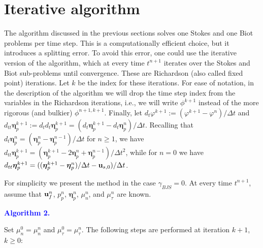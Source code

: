 \documentclass[11pt]{article}
\def\u{{\bf u}}
\def\bbeta{\boldsymbol{\eta}}
\def\dt{d_t}
\def\dtt{d_{tt}}
\begin{document}
\section{Iterative algorithm}\label{sec:iter}


The algorithm discussed in the previous sections solves one Stokes and one Biot problems per time step. This is a computationally efficient choice, but it introduces a splitting error. To avoid this error, one could use the iterative version of the algorithm, which at every time $t^{n+1}$ iterates over the Stokes and Biot sub-problems until convergence. These are Richardson (also called fixed point) iterations. Let $k$ be the index for these iterations. For ease of notation, in the description of the algorithm we will drop the time step index from the variables in the Richardson iterations, i.e., we will write $\phi^{k+1}$ instead of the more rigorous (and bulkier)  $\phi^{n+1, k+1}$. 
{Finally, let $\dt\varphi^{k+1} := (\varphi^{k+1} - \varphi^{n})/{\Delta t}$ and
$\dtt\bbeta_p^{k+1} := \dt \dt\bbeta_p^{k+1} = (\dt\bbeta_p^{k+1} - \dt\bbeta_p^n)/\Delta t$. Recalling that
$\dt \bbeta_p^{n} = (\bbeta_p^{n} - \bbeta_p^{n-1})/{\Delta t}$ for $n \ge 1$, we have
  $\dtt\bbeta_p^{k+1} = (\bbeta_p^{k+1} -2 \bbeta_p^{n}+\bbeta_p^{n-1})/{\Delta t^2}$, while for $n = 0$ we have $\dtt\bbeta_p^{k+1} = ((\bbeta_p^{k+1} - \bbeta_p^{n})/\Delta t - \u_{s,0})/\Delta t$.
  }

For simplicity we present the method in the case $\gamma_{BJS} = 0$.
At every time $t^{n+1}$, assume that $\u_f^n$, $p_p^n$, $\bbeta_p^{n}$,
$\mu_n^{n}$, and $\mu_\tau^n$ are known.


\bigskip
\noindent
\textcolor{blue}{{\bf Algorithm 2.}}

\medskip
Set $\mu_n^0 = \mu_n^n$ and $\mu_\tau^0 = \mu_\tau^n$. The following steps are performed at iteration $k+1$, $k \ge 0$:
\end{document}
